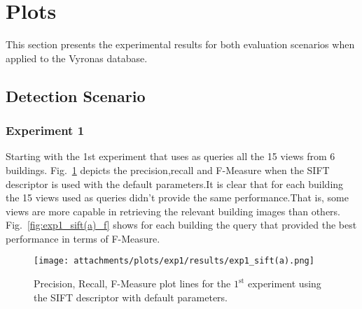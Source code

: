 \section{Plots}\label{plots}
    This section presents the experimental results for both evaluation scenarios when applied to the Vyronas database.
    \subsection{Detection Scenario}\label{detection_scenario} %
     \subsubsection{Experiment 1}\label{detection_exp1}
     
     Starting with the 1st experiment that uses as queries all the 15 views from 6 buildings.
     Fig.~\ref{fig:exp1_sift_a} depicts the precision,recall and F-Measure
     when the SIFT descriptor is used with the default parameters.It is clear that for each building the 15 views used as queries didn't provide the same performance.That is, some views are more capable in retrieving the relevant building images than others. Fig.~\ref{fig:exp1_sift(a)_f} shows for each building the query that provided the best performance in terms of F-Measure.
	
     	 \begin{figure}[hb!]
              \centering
              \texttt{[image: attachments/plots/exp1/results/exp1\_sift(a).png]}
              \caption{Precision, Recall, F-Measure plot lines for the $1^\text{st}$  experiment using the SIFT descriptor with default parameters.}
              \label{fig:exp1_sift_a}
         \end{figure}
         \newpage
	  
